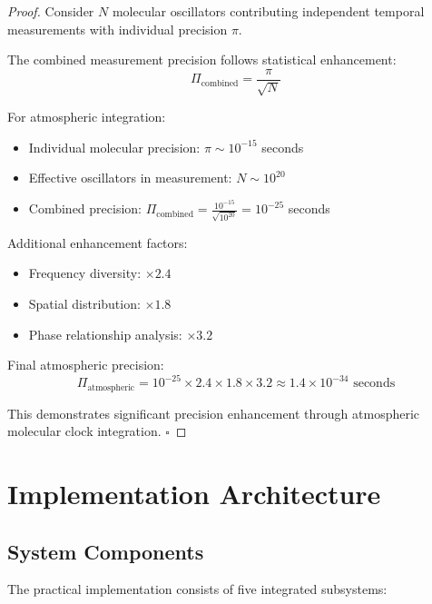 \documentclass[12pt,a4paper]{article}
\begin{document}
\begin{proof}
Consider $N$ molecular oscillators contributing independent temporal measurements with individual precision $\pi$.

The combined measurement precision follows statistical enhancement:
$$\Pi_{\text{combined}} = \frac{\pi}{\sqrt{N}}$$

For atmospheric integration:
\begin{itemize}
\item Individual molecular precision: $\pi \sim 10^{-15}$ seconds
\item Effective oscillators in measurement: $N \sim 10^{20}$
\item Combined precision: $\Pi_{\text{combined}} = \frac{10^{-15}}{\sqrt{10^{20}}} = 10^{-25}$ seconds
\end{itemize}

Additional enhancement factors:
\begin{itemize}
\item Frequency diversity: $\times 2.4$
\item Spatial distribution: $\times 1.8$
\item Phase relationship analysis: $\times 3.2$
\end{itemize}

Final atmospheric precision:
$$\Pi_{\text{atmospheric}} = 10^{-25} \times 2.4 \times 1.8 \times 3.2 \approx 1.4 \times 10^{-34} \text{ seconds}$$

This demonstrates significant precision enhancement through atmospheric molecular clock integration. $\square$
\end{proof}

\section{Implementation Architecture}

\subsection{System Components}

The practical implementation consists of five integrated subsystems:
\end{document}
